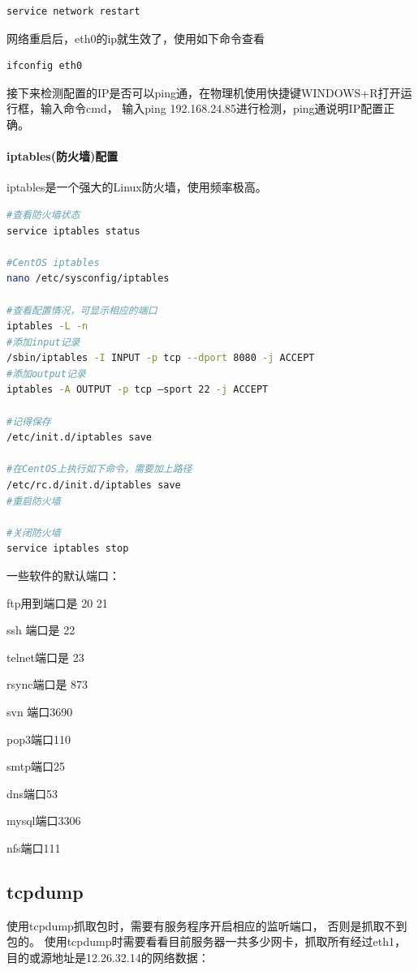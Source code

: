 \documentclass{book}
\begin{document}
\begin{lstlisting}[language=Bash]
service network restart
\end{lstlisting}

网络重启后，eth0的ip就生效了，使用如下命令查看

\begin{lstlisting}[language=Bash]
ifconfig eth0
\end{lstlisting}
 
接下来检测配置的IP是否可以ping通，在物理机使用快捷键WINDOWS+R打开运行框，输入命令cmd，
输入ping 192.168.24.85进行检测，ping通说明IP配置正确。

\paragraph{iptables(防火墙)配置}iptables是一个强大的Linux防火墙，使用频率极高。

\begin{lstlisting}[language=Bash]
#查看防火墙状态
service iptables status

#CentOS iptables
nano /etc/sysconfig/iptables

#查看配置情况，可显示相应的端口
iptables -L -n
#添加input记录
/sbin/iptables -I INPUT -p tcp --dport 8080 -j ACCEPT
#添加output记录
iptables -A OUTPUT -p tcp –sport 22 -j ACCEPT

#记得保存
/etc/init.d/iptables save

#在CentOS上执行如下命令，需要加上路径
/etc/rc.d/init.d/iptables save
#重启防火墙

#关闭防火墙
service iptables stop
\end{lstlisting}


一些软件的默认端口：

ftp用到端口是 20 21

ssh 端口是 22

telnet端口是 23

rsync端口是 873

svn 端口3690

pop3端口110

smtp端口25

dns端口53

mysql端口3306

nfs端口111

\subsection{tcpdump}

使用tcpdump抓取包时，需要有服务程序开启相应的监听端口，
否则是抓取不到包的。
使用tcpdump时需要看看目前服务器一共多少网卡，抓取所有经过eth1，目的或源地址是12.26.32.14的网络数据：
\end{document}
